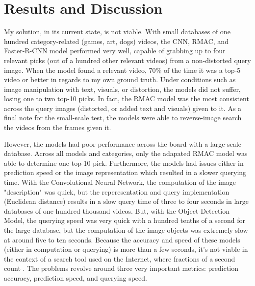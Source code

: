 \documentclass[10pt,twocolumn]{article}
\begin{document}
\section{Results and Discussion}

My solution, in its current state, is not viable. With small databases of one hundred category-related (games, art, dogs) videos, the CNN, RMAC, and Faster-R-CNN model performed very well, capable of grabbing up to four relevant picks (out of a hundred other relevant videos) from a non-distorted query image. When the model found a relevant video, 70\% of the time it was a top-5 video or better in regards to my own ground truth. Under conditions such as image manipulation with text, visuals, or distortion, the models did not suffer, losing one to two top-10 picks. In fact, the RMAC model was the most consistent across the query images (distorted, or added text and visuals) given to it. As a final note for the small-scale test, the models were able to reverse-image search the videos from the frames given it. 

However, the models had poor performance across the board with a large-scale database. Across all models and categories, only the adapated RMAC model was able to determine one top-10 pick. Furthermore, the models had issues either in prediction speed or the image representation which resulted in a slower querying time. With the Convolutional Neural Network, the computation of the image "description" was quick, but the reperesentation and query implementation (Euclidean distance) results in a slow query time of three to four seconds in large databases of one hundred thousand videos. But, with the Object Detection Model, the querying speed was very quick with a hundred tenths of a second for the large database, but the computation of the image objects was extremely slow at around five to ten seconds. Because the accuracy and speed of these models (either in computation or querying) is more than a few seconds, it's not viable in the context of a search tool used on the Internet, where fractions of a second count \cite{GoogleSpeedGospel}. The problems revolve around three very important metrics: prediction accuracy, prediction speed, and querying speed.
\end{document}
